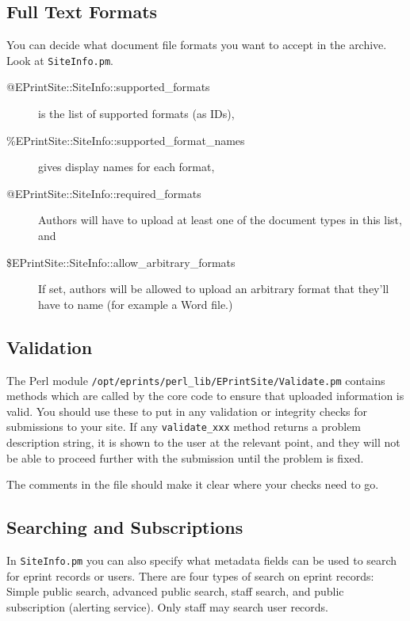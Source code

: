 \subsection{Full Text Formats}

You can decide what document file formats you want to accept in the archive. Look at {\tt SiteInfo.pm}.

\begin{description}
\item[@EPrintSite::SiteInfo::supported\_formats] is the list of supported formats (as IDs),
\item[\%EPrintSite::SiteInfo::supported\_format\_names] gives display names for each format,
\item[@EPrintSite::SiteInfo::required\_formats] Authors will have to upload at least one of the document types in this list, and
\item[\$EPrintSite::SiteInfo::allow\_arbitrary\_formats] If set, authors will be allowed to upload an arbitrary format that they'll have to name (for example a Word file.)
\end{description}


\subsection{Validation}

The Perl module {\tt /opt/eprints/perl\_lib/EPrintSite/Validate.pm} contains methods which are called by the core code to ensure that uploaded information is valid. You should use these to put in any validation or integrity checks for submissions to your site. If any {\tt validate\_xxx} method returns a problem description string, it is shown to the user at the relevant point, and they will not be able to proceed further with the submission until the problem is fixed.

The comments in the file should make it clear where your checks need to go.


\subsection{Searching and Subscriptions}

In {\tt SiteInfo.pm} you can also specify what metadata fields can be used to search for eprint records or users. There are four types of search on eprint records: Simple public search, advanced public search, staff search, and public subscription (alerting service). Only staff may search user records.

